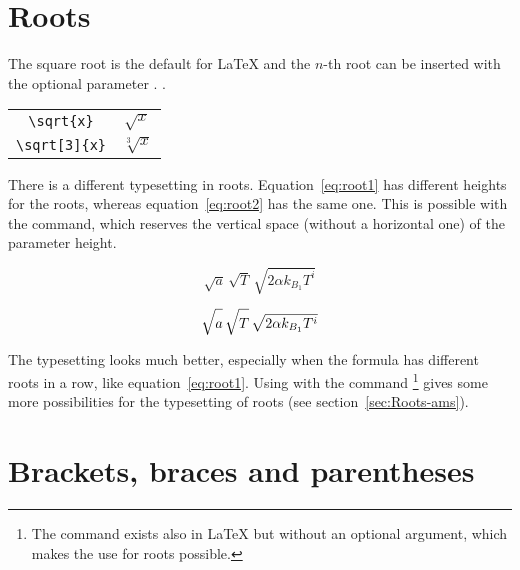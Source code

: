 \section{Roots}\label{sec:Roots}

The square root  is the default 
for \LaTeX{} and the $n$-th root can be inserted with the optional 
parameter .
.

\begin{center}
\begin{tabular}{cc}
  \verb|\sqrt{x}|    & $\sqrt{x}$\\
  \verb|\sqrt[3]{x}| & $\sqrt[3]{x}$
\end{tabular}
\end{center}

There is a different typesetting in roots. Equation~\vref{eq:root1}
has different heights for the roots, whereas equation~\vref{eq:root2}
has the same one. This is possible with the %
%
 command,
which reserves the vertical space (without a horizontal one) of the
parameter height.

\begin{LTXexample}[width=0.35\linewidth,wide]
\begin{equation}
  \sqrt{a}\,%
  \sqrt{T}\,%
  \sqrt{2\alpha k_{B_1}T^i}\label{eq:root1}
\end{equation}
\end{LTXexample}


\vspace{-10pt}
\begin{LTXexample}[width=0.35\linewidth,wide]
\begin{equation}\label{eq:root2}
  \sqrt{a\vphantom{k_{B_1}T^i}}\,%
  \sqrt{T\vphantom{k_{B_1}T^i}}\,%
  \sqrt{2\alpha k_{B_1}T^i}
\end{equation}
\end{LTXexample}


The typesetting looks much  better, especially when the formula
has different roots in a row, like equation~\vref{eq:root1}. Using
\AmSmath with the  command%
\footnote{The  command exists also in \LaTeX{}
but without an optional argument, which makes the use for roots possible.} 
gives some more possibilities for the typesetting of roots (see section~\vref{sec:Roots-ams}).


\section[Brackets, braces \ldots]{Brackets, braces and parentheses}\label{sec:Brackets,-Braces-and}

